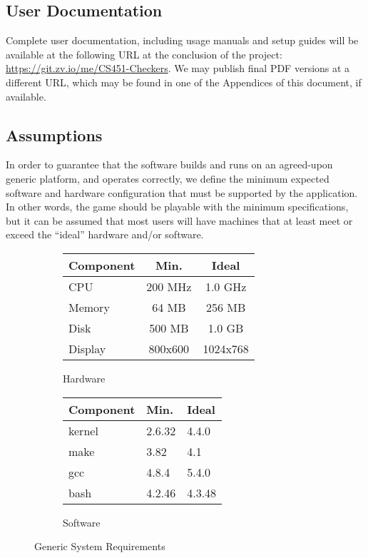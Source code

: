 \documentclass[letterpaper]{article}
\begin{document}
\subsection{User Documentation}
\label{sec:description_documentation}

Complete user documentation, including usage manuals and setup
guides will be available at the following URL at the conclusion
of the project:\\\url{https://git.zv.io/me/CS451-Checkers}. We
may publish final PDF versions at a different URL, which may be
found in one of the Appendices of this document, if available.

\subsection{Assumptions}
\label{sec:description_assumptions}

In order to guarantee that the software builds and runs on an
agreed-upon generic platform, and operates correctly, we define
the minimum expected software and hardware configuration that
must be supported by the application. In other words, the game
should be playable with the minimum specifications, but it can
be assumed that most users will have machines that at least
meet or exceed the ``ideal'' hardware and/or software.

\begin{figure}
    \centering
    \begin{subfigure}{.50\textwidth}
        \centering
        \begin{tabulary}{\linewidth}{LCC}
            Component & Min.    & Ideal    \\
            \hline
            CPU       & 200 MHz & 1.0 GHz  \\
            Memory    &  64 MB  & 256 MB   \\
            Disk      & 500 MB  & 1.0 GB   \\
            Display   & 800x600 & 1024x768 \\
        \end{tabulary}
        \caption{Hardware}
        \label{fig:description_assumptions_hard}
    \end{subfigure}%
    \begin{subfigure}{.50\textwidth}
        \centering
        \begin{tabulary}{\linewidth}{LLL}
            Component & Min.   & Ideal  \\
            \hline
            kernel    & 2.6.32 & 4.4.0  \\
            make      & 3.82   & 4.1    \\
            gcc       & 4.8.4  & 5.4.0  \\
            bash      & 4.2.46 & 4.3.48 \\
        \end{tabulary}
        \caption{Software}
        \label{fig:description_assumptions_soft}
    \end{subfigure}
    \caption{Generic System Requirements}
    \label{fig:description_assumptions}
\end{figure}
\end{document}
